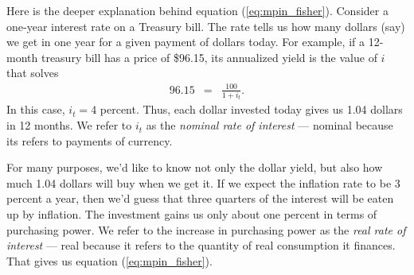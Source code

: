 Here is the deeper explanation behind equation (\ref{eq:mpin_fisher}).
Consider a one-year interest rate on a Treasury bill. 
The rate tells us how many dollars (say)
we get in one year for a given payment of dollars today.
For example, if a 12-month treasury bill has a price
of \$96.15, its annualized yield 
 is the value of $i$ that solves
%
\begin{eqnarray}
    96.15 &=& \frac{100}{1+i_t}.
    \label{eq:nominal_yield}
\end{eqnarray}
%
In this case, $i_t = 4$ percent.  Thus, each dollar invested today gives us
1.04 dollars in 12 months.
We refer to $i_t$ as the  {\it nominal rate of interest\/} --- nominal because its refers to payments of currency.

For many purposes, we'd like to know not only the dollar yield, but
also how much 1.04 dollars will buy when we get it.  If we expect
the inflation rate to be 3 percent a year, then we'd guess that three quarters of the
interest will be eaten up by inflation.  The investment gains
us only about one percent in terms of purchasing power.
We refer to the increase in purchasing power as the
{\it real rate of interest\/} --- real because it refers to the
quantity of real consumption it finances.
That gives us equation (\ref{eq:mpin_fisher}).


